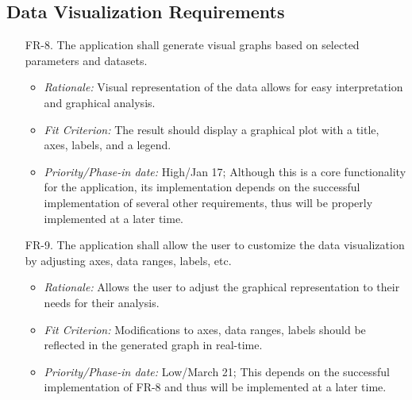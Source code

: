 \documentclass[12pt]{article}
\begin{document}
\subsection{Data Visualization Requirements}
\begin{enumerate}
  \item[FR-8.] The application shall generate visual graphs based on selected parameters and datasets.
  \begin{itemize}
    \item \textit{Rationale:} Visual representation of the data allows for easy interpretation and graphical analysis.
    \item \textit{Fit Criterion:} The result should display a graphical plot with a title, axes, labels, and a legend.
    \item \textit{Priority/Phase-in date:} High/Jan 17; Although this is a core functionality for the application, its implementation depends on the successful implementation of several other requirements, thus will be properly implemented at a later time.
  \end{itemize}
  \item[FR-9.] The application shall allow the user to customize the data visualization by adjusting axes, data ranges, labels, etc.
  \begin{itemize}
    \item \textit{Rationale:} Allows the user to adjust the graphical representation to their needs for their analysis.
    \item \textit{Fit Criterion:} Modifications to axes, data ranges, labels should be reflected in the generated graph in real-time.
    \item \textit{Priority/Phase-in date:} Low/March 21; This depends on the successful implementation of FR-8 and thus will be implemented at a later time.
  \end{itemize}
\end{enumerate}
\end{document}
